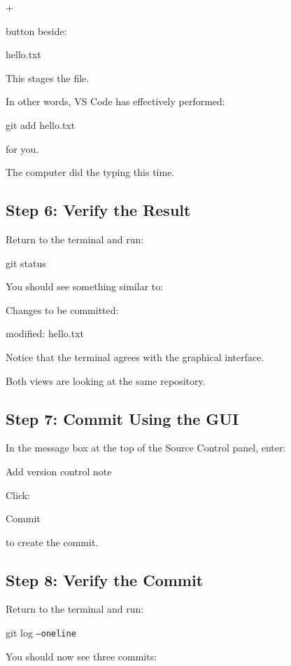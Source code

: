 \documentclass{csc2059practical}
\begin{document}
+

button beside:

\begin{terminalplain}
hello.txt
\end{terminalplain}
This stages the file.

In other words, VS Code has effectively performed:

\begin{terminalplain}
git add hello.txt
\end{terminalplain}
for you.

The computer did the typing this time.

\subsection{Step 6: Verify the Result}
Return to the terminal and run:

\begin{terminalplain}
git status
\end{terminalplain}
You should see something similar to:

\begin{terminalplain}
Changes to be committed:

\hspace*{1cm}\textcolor{GitGreen}{modified: hello.txt}
\end{terminalplain}
Notice that the terminal agrees with the graphical interface.

Both views are looking at the same repository.

\subsection{Step 7: Commit Using the GUI}
In the message box at the top of the Source Control panel, enter:

Add version control note

Click:

Commit

to create the commit.

\subsection{Step 8: Verify the Commit}
Return to the terminal and run:

\begin{terminalplain}
git log \texttt{--oneline}
\end{terminalplain}
You should now see three commits:
\end{document}

